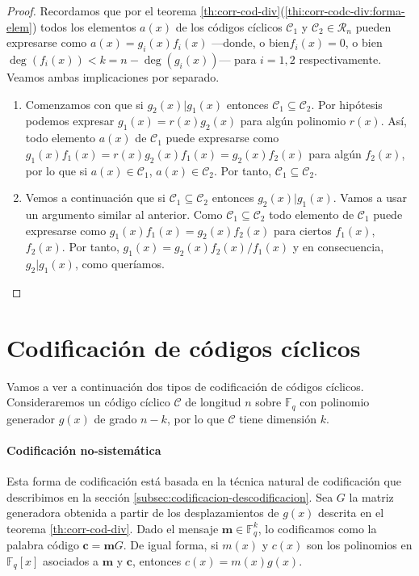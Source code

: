 \begin{proof}
  Recordamos que por el teorema \ref{th:corr-cod-div}(\ref{thi:corr-codc-div:forma-elem}) todos los elementos \(a(x)\) de los códigos cíclicos \(\mathcal C_1\) y \(\mathcal C_2 \in \mathcal R_n\) pueden expresarse como \(a(x) = g_i(x)f_i(x)\) —donde, o bien\(f_i(x) = 0\), o bien \(\deg(f_i(x)) < k = n - \deg(g_i(x))\)— para \(i = 1, 2\) respectivamente.
  Veamos ambas implicaciones por separado.
  \begin{enumerate}
    \item Comenzamos con que si \(g_2(x) | g_1(x)\) entonces \(\mathcal C_1 \subseteq \mathcal C_2\).
    Por hipótesis podemos expresar \(g_1(x) = r(x)g_2(x)\) para algún polinomio \(r(x)\).
    Así, todo elemento \(a(x)\) de \(\mathcal C_1\) puede expresarse como \(g_1(x)f_1(x) = r(x)g_2(x)f_1(x) = g_2(x)f_2(x)\) para algún \(f_2(x)\), por lo que si \(a(x) \in \mathcal C_1\), \(a(x) \in \mathcal C_2\).
    Por tanto, \(\mathcal C_1 \subseteq \mathcal C_2\).
    \item Vemos a continuación que si \(\mathcal C_1 \subseteq \mathcal C_2\) entonces \(g_2(x) | g_1(x)\).
    Vamos a usar un argumento similar al anterior.
    Como \(\mathcal C_1 \subseteq \mathcal C_2\) todo elemento de \(\mathcal C_1\) puede expresarse como \(g_1(x)f_1(x) = g_2(x)f_2(x)\) para ciertos \(f_1(x)\), \(f_2(x)\).
    Por tanto, \(g_1(x) = g_2(x)f_2(x)/f_1(x)\) y en consecuencia, \(g_2 | g_1(x)\), como queríamos.\qedhere
  \end{enumerate}
\end{proof}

\section{Codificación de códigos cíclicos}

Vamos a ver a continuación dos tipos de codificación de códigos cíclicos.
Consideraremos un código cíclico \(\mathcal C\) de longitud \(n\) sobre \(\mathbb F_q\) con polinomio generador \(g(x)\) de grado \(n - k\), por lo que \(\mathcal C\) tiene dimensión \(k\).

\paragraph{Codificación no-sistemática}

Esta forma de codificación está basada en la técnica natural de codificación que describimos en la sección \ref{subsec:codificacion-descodificacion}.
Sea \(G\) la matriz generadora obtenida a partir de los desplazamientos de \(g(x)\) descrita en el teorema \ref{th:corr-cod-div}.
Dado el mensaje \(\mathbf m \in \mathbb F_q^k\), lo codificamos como la palabra código \(\mathbf c = \mathbf mG\).
De igual forma, si \(m(x)\) y \(c(x)\) son los polinomios en \(\mathbb F_q[x]\) asociados a \(\mathbf{m}\) y \(\mathbf c\), entonces \(c(x) = m(x)g(x)\).

